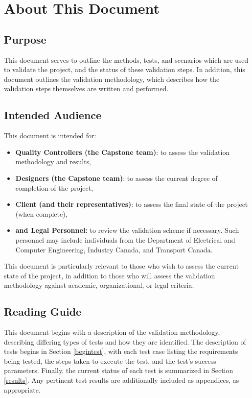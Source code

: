 \documentclass[10pt,letterpaper]{article}
\begin{document}




\section{About This Document}

\subsection{Purpose}
This document serves to outline the methods, tests, and scenarios which are used to validate the project, and the status of these validation steps. In addition, this document outlines the validation methodology, which describes how the validation steps themselves are written and performed.

\subsection{Intended Audience}
This document is intended for:
\begin{itemize}
\item \textbf{Quality Controllers (the Capstone team)}: to assess the validation methodology and results,
\item \textbf{Designers (the Capstone team)}: to assess the current degree of completion of the project,
\item \textbf{Client (and their representatives)}: to assess the final state of the project (when complete),
\item \textbf{and Legal Personnel:} to review the validation scheme if necessary. Such personnel may include individuals from the Department of Electrical and Computer Engineering, Industry Canada, and Transport Canada.
\end{itemize}

This document is particularly relevant to those who wish to assess the current state of the project, in addition to those who will assess the validation methodology against academic, organizational, or legal criteria.

\subsection{Reading Guide}
This document begins with a description of the validation methodology, describing differing types of tests and how they are identified. The description of tests begins in Section \ref{begintest}, with each test case listing the requirements being tested, the steps taken to execute the test, and the test's success parameters. Finally, the current status of each test is summarized in Section \ref{results}. Any pertinent test results are additionally included as appendices, as appropriate.
\end{document}

